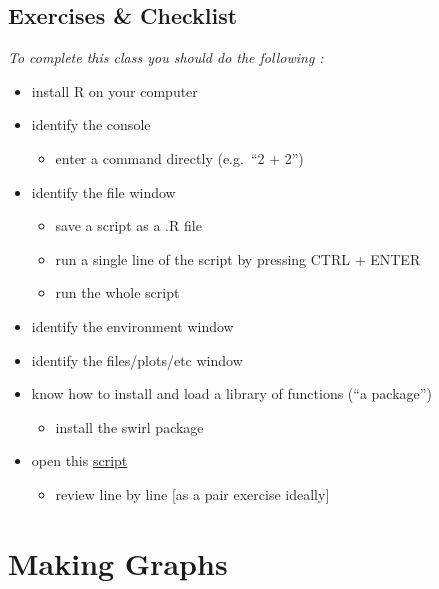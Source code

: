 \documentclass[
]{book}
\providecommand{\tightlist}{%
  \setlength{\itemsep}{0pt}\setlength{\parskip}{0pt}}
\begin{document}
\hypertarget{exercises-checklist}{%
\section{Exercises \& Checklist}\label{exercises-checklist}}

\emph{To complete this class you should do the following :}

\begin{itemize}
\item
  install R on your computer
\item
  identify the console

  \begin{itemize}
  \tightlist
  \item
    enter a command directly (e.g.~``2 + 2'')
  \end{itemize}
\item
  identify the file window

  \begin{itemize}
  \tightlist
  \item
    save a script as a .R file
  \item
    run a single line of the script by pressing CTRL + ENTER
  \item
    run the whole script
  \end{itemize}
\item
  identify the environment window
\item
  identify the files/plots/etc window
\item
  know how to install and load a library of functions (``a package'')

  \begin{itemize}
  \tightlist
  \item
    install the swirl package
  \end{itemize}
\item
  open this \href{static/class2.R}{script}

  \begin{itemize}
  \tightlist
  \item
    review line by line {[}as a pair exercise ideally{]}
  \end{itemize}
\end{itemize}

\hypertarget{making-graphs}{%
\chapter{Making Graphs}\label{making-graphs}}
\end{document}
